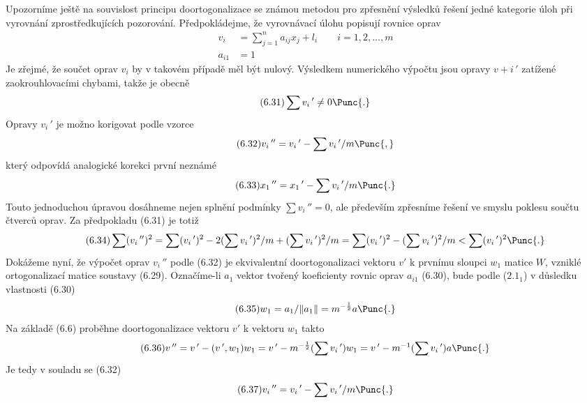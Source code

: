  Upozorníme ještě na souvislost principu doortogonalizace se
známou metodou pro zpřesnění výsledků řešení jedné kategorie úloh
při vyrovnání zprostředkujících pozorování.  Předpokládejme, že
vyrovnávací úlohu popisují rovnice oprav
%
\begin{align*}
  \tag{6.29}  v_i   &= \sum_{j=1}^{n} a_{ij} x_j + l_i \qquad  i=1,2,\dots,m \\
  \tag{6.30}  a_{i1} &= 1
\end{align*}
%
Je zřejmé, že součet oprav $v_i$ by v takovém případě měl být
nulový. Výsledkem numerického výpočtu jsou opravy $v+i\,'$ zatížené
zaokrouhlovacími chybami, takže je obecně
%
\begin{align*}
  \tag{6.31}  \sum v_i\,' \ne 0 \Punc{.}
\end{align*}
%
Opravy $v_i\,'$ je možno korigovat podle vzorce
%
\begin{align*}
  \tag{6.32} v_i\,'' = v_i\,' - \sum v_i\,'/m  \Punc{,}
\end{align*}
%
který odpovídá analogické korekci první neznámé
%
\begin{align*}
\tag{6.33}   x_1\,'' = x_1\,' - \sum v_i\,' / m \Punc{.}
\end{align*}
%
Touto jednoduchou úpravou dosáhneme nejen splnění podmínky $\sum
v_i\,'' = 0$, ale především zpřesníme řešení ve smyslu poklesu
součtu čtverců oprav. Za předpokladu (6.31) je totiž
%
\begin{align*}
  \tag{6.34}
  \sum (v_i\,'')^2 = \sum (v_i\,')^2
  -2(\sum v_i\,')^2/m + (\sum v_i\,')^2/m
  = \sum (v_i\,')^2 -(\sum v_i\,')^2/m < \sum(v_i\,')^2 \Punc{.}
\end{align*}
%
Dokážeme nyní, že výpočet oprav $v_i\,''$ podle (6.32) je ekvivalentní
doortogonalizaci vektoru $v'$ k prvnímu sloupci $w_1$ matice $W$,
vzniklé ortogonalizací matice soustavy (6.29). Označíme-li $a_1$
vektor tvořený koeficienty rovnic oprav $a_{i1}$ (6.30), bude podle
($2.1_1$) v důsledku vlastnosti (6.30)
%
\begin{align*}
  \tag{6.35}
  w_1 = a_1/\Vert a_1\Vert = m^{-{1\over2}}a \Punc{.}
\end{align*}
%
Na základě (6.6) proběhne doortogonalizace vektoru $v'$ k vektoru
$w_1$ takto 
%
\begin{align*}
  \tag{6.36}
  v\,'' = v\,' - (v\,',w_1)w_1 = v\,' - m^{-{1\over2}}(\sum v_i\,')w_1
  = v\,' - m^{-1}(\sum v_i\,')a \Punc{.}
\end{align*}
%
Je tedy v souladu se (6.32)
%
\begin{align*}
  \tag{6.37}
  v_i\,'' = v_i\,' - \sum v_i\,'/m \Punc{.}
\end{align*}
